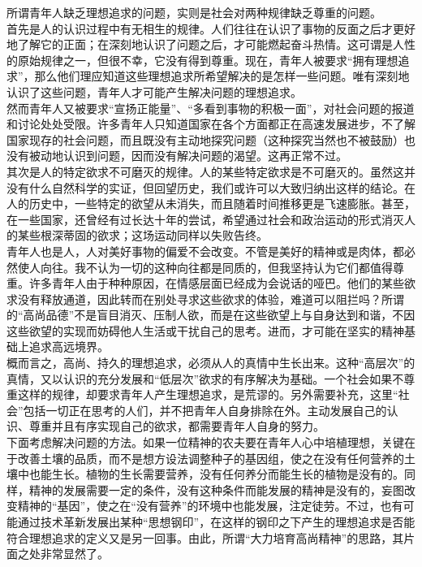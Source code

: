 \documentclass{article}
\begin{document}
所谓青年人缺乏理想追求的问题，实则是社会对两种规律缺乏尊重的问题。\\

首先是人的认识过程中有无相生的规律。人们往往在认识了事物的反面之后才更好地了解它的正面；在深刻地认识了问题之后，才可能燃起奋斗热情。这可谓是人性的原始规律之一，但很不幸，它没有得到尊重。现在，青年人被要求“拥有理想追求”，那么他们理应知道这些理想追求所希望解决的是怎样一些问题。唯有深刻地认识了这些问题，青年人才可能产生解决问题的理想追求。\\

然而青年人又被要求“宣扬正能量”、“多看到事物的积极一面”，对社会问题的报道和讨论处处受限。许多青年人只知道国家在各个方面都正在高速发展进步，不了解国家现存的社会问题，而且既没有主动地探究问题（这种探究当然也不被鼓励）也没有被动地认识到问题，因而没有解决问题的渴望。这再正常不过。\\

其次是人的特定欲求不可磨灭的规律。人的某些特定欲求是不可磨灭的。虽然这并没有什么自然科学的实证，但回望历史，我们或许可以大致归纳出这样的结论。在人的历史中，一些特定的欲望从未消失，而且随着时间推移更是飞速膨胀。甚至，在一些国家，还曾经有过长达十年的尝试，希望通过社会和政治运动的形式消灭人的某些根深蒂固的欲求；这场运动同样以失败告终。\\

青年人也是人，人对美好事物的偏爱不会改变。不管是美好的精神或是肉体，都必然使人向往。我不认为一切的这种向往都是同质的，但我坚持认为它们都值得尊重。许多青年人由于种种原因，在情感层面已经成为会说话的哑巴。他们的某些欲求没有释放通道，因此转而在别处寻求这些欲求的体验，难道可以阻拦吗？所谓的“高尚品德”不是盲目消灭、压制人欲，而是在这些欲望上与自身达到和谐，不因这些欲望的实现而妨碍他人生活或干扰自己的思考。进而，才可能在坚实的精神基础上追求高远境界。\\

概而言之，高尚、持久的理想追求，必须从人的真情中生长出来。这种“高层次”的真情，又以认识的充分发展和“低层次”欲求的有序解决为基础。一个社会如果不尊重这样的规律，却要求青年人产生理想追求，是荒谬的。另外需要补充，这里“社会”包括一切正在思考的人们，并不把青年人自身排除在外。主动发展自己的认识、尊重并且有序实现自己的欲求，都需要青年人自身的努力。\\

下面考虑解决问题的方法。如果一位精神的农夫要在青年人心中培植理想，关键在于改善土壤的品质，而不是想方设法调整种子的基因组，使之在没有任何营养的土壤中也能生长。植物的生长需要营养，没有任何养分而能生长的植物是没有的。同样，精神的发展需要一定的条件，没有这种条件而能发展的精神是没有的，妄图改变精神的“基因”，使之在“没有营养”的环境中也能发展，注定徒劳。不过，也有可能通过技术革新发展出某种“思想钢印”，在这样的钢印之下产生的理想追求是否能符合理想追求的定义又是另一回事。由此，所谓“大力培育高尚精神”的思路，其片面之处非常显然了。\\

\newpage
\end{document}
